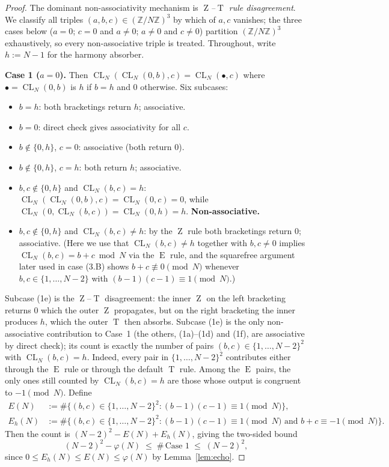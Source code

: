\documentclass[11pt,reqno]{amsart}
\theoremstyle{plain}
\theoremstyle{definition}
\theoremstyle{remark}
\DeclareMathOperator{\CL}{CL}
\DeclareMathOperator{\ECHO}{E}
\DeclareMathOperator{\HARM}{T}
\DeclareMathOperator{\VOID}{Z}
\newcommand{\ZN}{\mathbb{Z}/N\mathbb{Z}}
\begin{document}
\begin{proof}
The dominant non-associativity mechanism is \emph{$\VOID$--$\HARM$ rule
disagreement}. We classify all triples
$(a,b,c)\in(\ZN)^{3}$ by which of $a,c$ vanishes; the three cases
below ($a=0$; $c=0$ and $a\neq 0$; $a\neq 0$ and $c\neq 0$) partition
$(\ZN)^{3}$ exhaustively, so every non-associative triple is treated.
Throughout, write $h:=N-1$ for the harmony absorber.

\medskip
\noindent\textbf{Case 1 ($a=0$).} Then
$\CL_N(\CL_N(0,b),c)=\CL_N(\bullet,c)$ where
$\bullet=\CL_N(0,b)$ is $h$ if $b=h$ and $0$ otherwise. Six subcases:
\begin{itemize}\setlength\itemsep{0pt}
\item[(1a)] $b=h$: both bracketings return $h$; associative.
\item[(1b)] $b=0$: direct check gives associativity for all $c$.
\item[(1c)] $b\notin\{0,h\}$, $c=0$: associative (both return $0$).
\item[(1d)] $b\notin\{0,h\}$, $c=h$: both return $h$; associative.
\item[(1e)] $b,c\notin\{0,h\}$ and $\CL_N(b,c)=h$:
  $\CL_N(\CL_N(0,b),c)=\CL_N(0,c)=0$, while
  $\CL_N(0,\CL_N(b,c))=\CL_N(0,h)=h$. \textbf{Non-associative.}
\item[(1f)] $b,c\notin\{0,h\}$ and $\CL_N(b,c)\neq h$: by the
  $\VOID$ rule both bracketings return $0$; associative. (Here we use
  that $\CL_N(b,c)\ne h$ together with $b,c\ne 0$ implies
  $\CL_N(b,c) = b+c\bmod N$ via the $\ECHO$ rule, and the squarefree
  argument later used in case (3.B) shows $b+c\not\equiv 0\pmod N$
  whenever $b,c\in\{1,\dots,N-2\}$ with $(b-1)(c-1)\equiv 1\pmod N$.)
\end{itemize}
Subcase (1e) is the $\VOID$--$\HARM$ disagreement: the inner $\VOID$
on the left bracketing returns $0$ which the outer $\VOID$ propagates,
but on the right bracketing the inner produces $h$, which the outer
$\HARM$ then absorbs. Subcase (1e) is the only non-associative
contribution to Case~1 (the others, (1a)--(1d) and (1f), are
associative by direct check); its count is exactly the number of
pairs $(b,c)\in\{1,\dots,N-2\}^{2}$ with $\CL_N(b,c)=h$. Indeed,
every pair in $\{1,\dots,N-2\}^{2}$ contributes either through the
$\ECHO$ rule or through the default $\HARM$ rule. Among the
$\ECHO$ pairs, the only ones still counted by $\CL_N(b,c)=h$ are
those whose output is congruent to $-1\pmod N$. Define
\begin{align}
  E(N)   &:= \#\{(b,c)\in\{1,\dots,N-2\}^{2}:(b-1)(c-1)\equiv 1\pmod N\},
  \label{eq:Edef}\\
  E_{h}(N) &:= \#\{(b,c)\in\{1,\dots,N-2\}^{2}:(b-1)(c-1)\equiv 1\pmod N
            \text{ and }b+c\equiv -1\pmod N\}.
  \label{eq:Ehdef}
\end{align}
Then the count is $(N-2)^{2}-E(N)+E_{h}(N)$, giving the two-sided bound
\begin{equation}\label{eq:case1-bounds}
  (N-2)^{2}-\varphi(N)\;\le\;\#\,\text{Case 1}\;\le\;(N-2)^{2},
\end{equation}
since $0\le E_{h}(N)\le E(N)\le\varphi(N)$ by Lemma~\ref{lem:echo}.


\end{proof}
\end{document}
